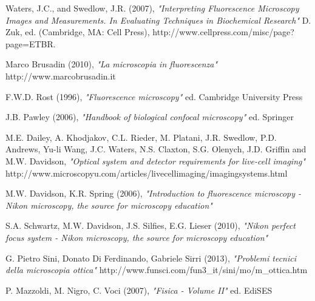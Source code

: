 \clearpage{\pagestyle{empty}\cleardoublepage}

\begin{thebibliography}{3}


 Waters, J.C., and Swedlow, J.R. (2007), \emph {"Interpreting Fluorescence Microscopy Images and Measurements. In Evaluating Techniques in Biochemical Research"} \newline D. Zuk, ed. (Cambridge, MA: Cell Press), \newline http://www.cellpress.com/misc/page?page=ETBR.

 Marco Brusadin (2010), \emph{"La microscopia in fluorescenza"} \newline  http://www.marcobrusadin.it

 F.W.D. Rost (1996), \emph{"Fluorescence microscopy"} \newline ed. Cambridge University Press

 J.B. Pawley (2006), \emph{"Handbook of biological confocal microscopy"} \newline ed. Springer

 M.E. Dailey, A. Khodjakov, C.L. Rieder, M. Platani, J.R. Swedlow, P.D. Andrews, Yu-li Wang, J.C. Waters, N.S. Claxton, S.G. Olenych, J.D. Griffin and M.W. Davidson, \emph{"Optical system and detector requirements for live-cell imaging"} \newline http://www.microscopyu.com/articles/livecellimaging/imagingsystems.html

 M.W. Davidson, K.R. Spring (2006), \emph{"Introduction to fluorescence microscopy - Nikon microscopy, the source for microscopy education"} 

 S.A. Schwartz, M.W. Davidson, J.S. Silfies, E.G. Lieser (2010), \emph{"Nikon perfect focus system - Nikon microscopy, the source for microscopy education"} 

 G. Pietro Sini, Donato Di Ferdinando, Gabriele Sirri (2013), \emph{"Problemi tecnici della microscopia ottica"} \newline http://www.funsci.com/fun3\_it/sini/mo/m\_ottica.htm

 P. Mazzoldi, M. Nigro, C. Voci (2007), \emph{"Fisica - Volume II"} \newline ed. EdiSES


\end{thebibliography}
